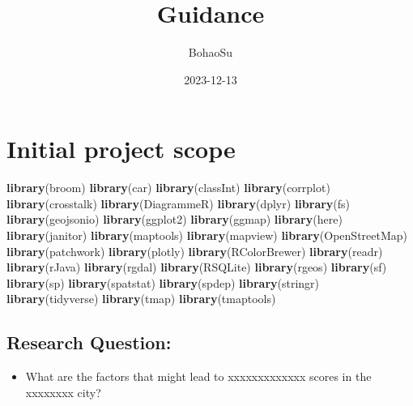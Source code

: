 \documentclass[
]{article}
\title{Guidance}
\author{BohaoSu}
\date{2023-12-13}
\newenvironment{Shaded}{\begin{snugshade}}{\end{snugshade}}
\newcommand{\FunctionTok}[1]{\textcolor[rgb]{0.13,0.29,0.53}{\textbf{#1}}}
\newcommand{\NormalTok}[1]{#1}
\providecommand{\tightlist}{%
  \setlength{\itemsep}{0pt}\setlength{\parskip}{0pt}}
\begin{document}
\maketitle

{
\hypersetup{linkcolor=}
\setcounter{tocdepth}{2}
\tableofcontents
}
\hypertarget{initial-project-scope}{%
\section{Initial project scope}\label{initial-project-scope}}

\begin{Shaded}
\begin{Highlighting}[]
\FunctionTok{library}\NormalTok{(broom)}
\FunctionTok{library}\NormalTok{(car)}
\FunctionTok{library}\NormalTok{(classInt)}
\FunctionTok{library}\NormalTok{(corrplot)}
\FunctionTok{library}\NormalTok{(crosstalk)}
\FunctionTok{library}\NormalTok{(DiagrammeR)}
\FunctionTok{library}\NormalTok{(dplyr)}
\FunctionTok{library}\NormalTok{(fs)}
\FunctionTok{library}\NormalTok{(geojsonio)}
\FunctionTok{library}\NormalTok{(ggplot2)}
\FunctionTok{library}\NormalTok{(ggmap)}
\FunctionTok{library}\NormalTok{(here)}
\FunctionTok{library}\NormalTok{(janitor)}
\FunctionTok{library}\NormalTok{(maptools)}
\FunctionTok{library}\NormalTok{(mapview)}
\FunctionTok{library}\NormalTok{(OpenStreetMap)}
\FunctionTok{library}\NormalTok{(patchwork)}
\FunctionTok{library}\NormalTok{(plotly)}
\FunctionTok{library}\NormalTok{(RColorBrewer)}
\FunctionTok{library}\NormalTok{(readr)}
\FunctionTok{library}\NormalTok{(rJava)}
\FunctionTok{library}\NormalTok{(rgdal)}
\FunctionTok{library}\NormalTok{(RSQLite)}
\FunctionTok{library}\NormalTok{(rgeos)}
\FunctionTok{library}\NormalTok{(sf)}
\FunctionTok{library}\NormalTok{(sp)}
\FunctionTok{library}\NormalTok{(spatstat)}
\FunctionTok{library}\NormalTok{(spdep)}
\FunctionTok{library}\NormalTok{(stringr)}
\FunctionTok{library}\NormalTok{(tidyverse)}
\FunctionTok{library}\NormalTok{(tmap)}
\FunctionTok{library}\NormalTok{(tmaptools)}
\end{Highlighting}
\end{Shaded}

\hypertarget{research-question}{%
\subsection{Research Question:}\label{research-question}}

\begin{itemize}
\tightlist
\item
  What are the factors that might lead to xxxxxxxxxxxxx scores in the
  xxxxxxxx city?
\end{itemize}
\end{document}
